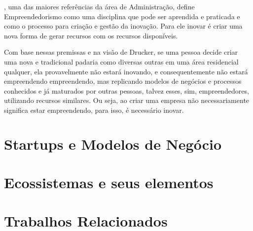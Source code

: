 \cite{Drucker2006}, uma das maiores referências da área de Administração, define Empreendedorismo como uma disciplina que pode ser aprendida e praticada e como o processo para criação e gestão da inovação. Para ele inovar é criar uma nova forma de gerar recursos com os recursos disponíveis. 

Com base nessas premissas e na visão de Drucker, se uma pessoa decide criar uma nova e tradicional padaria como diversas outras em uma área residencial qualquer, ela provavelmente não estará inovando, e consequentemente não estará empreendendo empreendendo, mas replicando modelos de negócios e processos conhecidos e já maturados por outras pessoas, talvez esses, sim, empreendedores, utilizando recursos similares. Ou seja, ao criar uma empresa não necessariamente significa estar empreendendo, para isso, é necessário inovar.


\section{Startups e Modelos de Negócio}
\label{section:startups_e_modelos_de_negocio}

\section{Ecossistemas e seus elementos}
\label{section:ecossistemas_e_suas_pecas}

\section{Trabalhos Relacionados}
\label{section:trabalhos_relacionados}

